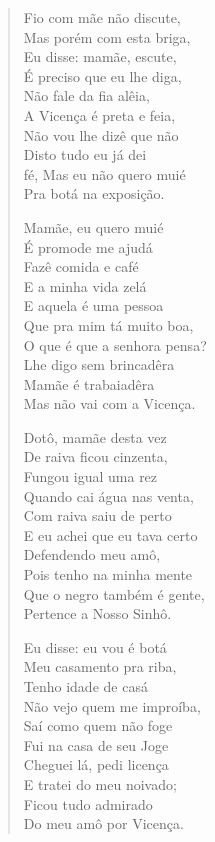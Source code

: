 \begin{verse}
Fio com mãe não discute,\\
Mas porém com esta briga,\\
Eu disse: mamãe, escute,\\
É preciso que eu lhe diga,\\
Não fale da fia alêia,\\
A Vicença é preta e feia,\\
Não vou lhe dizê que não\\
Disto tudo eu já dei\\
fé, Mas eu não quero muié\\
Pra botá na exposição.

Mamãe, eu quero muié\\
É promode me ajudá\\
Fazê comida e café\\
E a minha vida zelá\\
E aquela é uma pessoa\\
Que pra mim tá muito boa,\\
O que é que a senhora pensa?\\
Lhe digo sem brincadêra\\
Mamãe é trabaiadêra\\
Mas não vai com a Vicença.

Dotô, mamãe desta vez\\
De raiva ficou cinzenta,\\
Fungou igual uma rez\\
Quando cai água nas venta,\\
Com raiva saiu de perto\\
E eu achei que eu tava certo\\
Defendendo meu amô,\\
Pois tenho na minha mente\\
Que o negro também é gente,\\
Pertence a Nosso Sinhô.

Eu disse: eu vou é botá\\
Meu casamento pra riba,\\
Tenho idade de casá\\
Não vejo quem me improíba,\\
Saí como quem não foge\\
Fui na casa de seu Joge\\
Cheguei lá, pedi licença\\
E tratei do meu noivado;\\
Ficou tudo admirado\\
Do meu amô por Vicença.


\end{verse}
